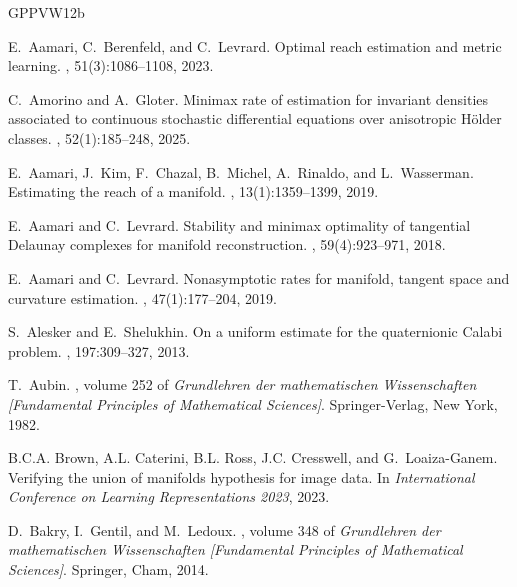\documentclass[10pt,a4paper]{article}
\begin{document}
{\footnotesize
\newcommand{\etalchar}[1]{$^{#1}$}
\begin{thebibliography}{GPPVW12b}

E.~Aamari, C.~Berenfeld, and C.~Levrard.
\newblock Optimal reach estimation and metric learning.
, 51(3):1086--1108, 2023.

C.~Amorino and A.~Gloter.
\newblock Minimax rate of estimation for invariant densities associated to
  continuous stochastic differential equations over anisotropic {H}\"older
  classes.
, 52(1):185--248, 2025.

\bibitem[AKC{\etalchar{+}}19]{aamari2019estimating}
E.~Aamari, J.~Kim, F.~Chazal, B.~Michel, A.~Rinaldo, and L.~Wasserman.
\newblock Estimating the reach of a manifold.
, 13(1):1359--1399, 2019.

E.~Aamari and C.~Levrard.
\newblock Stability and minimax optimality of tangential {D}elaunay complexes
  for manifold reconstruction.
, 59(4):923--971, 2018.

E.~Aamari and C.~Levrard.
\newblock Nonasymptotic rates for manifold, tangent space and curvature
  estimation.
, 47(1):177--204, 2019.

S.~{Alesker} and E.~{Shelukhin}.
\newblock On a uniform estimate for the quaternionic {Calabi} problem.
, 197:309--327, 2013.

T.~{Aubin}.
,
  volume 252 of {\em Grundlehren der mathematischen Wissenschaften [Fundamental
  Principles of Mathematical Sciences]}.
\newblock Springer-Verlag, New York, 1982.

\bibitem[BCR{\etalchar{+}}23]{brown2022union}
B.C.A. Brown, A.L. Caterini, B.L. Ross, J.C. Cresswell, and G.~Loaiza-Ganem.
\newblock Verifying the union of manifolds hypothesis for image data.
\newblock In {\em International Conference on Learning Representations 2023},
  2023.

D.~{Bakry}, I.~{Gentil}, and M.~{Ledoux}.
, volume
  348 of {\em Grundlehren der mathematischen Wissenschaften [Fundamental
  Principles of Mathematical Sciences]}.
\newblock Springer, Cham, 2014.


\end{thebibliography}}
\end{document}
